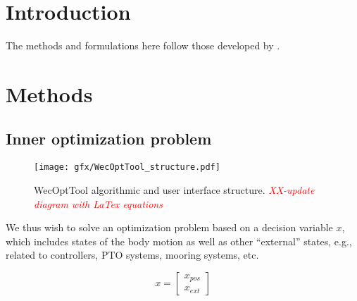 \documentclass[]{article}
\newcommand{\todo}[1]{\textcolor{red}{\emph{#1}}}
\begin{document}
\author[1]{Ryan G. Coe}
\author[1]{Giorgio Bacelli}
\author[1]{Sterling S. Olson}
\author[2]{Mathew B. R. Topper}
\author[1]{Vincent S. Neary}
\author[3]{Alex Hagmuller}
\author[3]{Max Ginsburg}


\maketitle


\section{Introduction}\label{sec:intro}

The methods and formulations here follow those developed by \citet{Bacelli2014}.


\section{Methods}\label{sec:methods}

\subsection{Inner optimization problem}\label{sec:inner_optimization_problem}

\begin{figure*}[tb]
	\centering
	\texttt{[image: gfx/WecOptTool\_structure.pdf]}
	\caption{WecOptTool algorithmic and user interface structure. \todo{XX-update diagram with LaTex equations}}
	\label{fig:WecOptTool_structure}
\end{figure*}

We thus wish to solve an optimization problem based on a decision variable $x$, which includes states of the body motion as well as other ``external'' states, e.g., related to controllers, PTO systems, mooring systems, etc.

\begin{equation}\label{eq:decision_variable}
	x =
	\begin{bmatrix}
		x_{pos}\\
		x_{ext}
	\end{bmatrix}
\end{equation}
\end{document}
